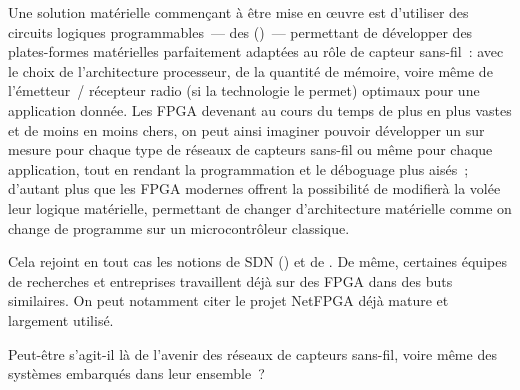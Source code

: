 \medskip

Une solution matérielle commençant à être mise en {\oe}uvre est
d'utiliser des circuits logiques programmables~--- des 
()~--- permettant de développer
des plates-formes matérielles parfaitement adaptées au rôle de capteur
sans-fil~: avec le choix de l'architecture processeur, de la quantité
de mémoire, voire même de l'émetteur~/ récepteur radio (si la technologie
le permet) optimaux pour une application donnée. Les FPGA devenant au
cours du temps de plus en plus vastes et de moins en moins chers, on peut
ainsi imaginer pouvoir développer un  sur mesure
pour chaque type de réseaux de capteurs sans-fil ou même pour chaque
application, tout en rendant la programmation et le déboguage plus aisés~;
d'autant plus que les FPGA modernes offrent la possibilité de
modifier\footnotemark[2] à la volée leur logique matérielle, permettant
de changer d'architecture matérielle comme on change de programme sur un
microcontrôleur classique.


Cela rejoint en tout cas les notions de SDN () et de . De même, certaines
équipes de recherches et entreprises travaillent déjà sur des FPGA
dans des buts similaires. On peut notamment citer le projet NetFPGA
\cite{NetFPGA} déjà mature et largement utilisé\footnotemark[3].

Peut-être s'agit-il là de l'avenir des réseaux de capteurs sans-fil,
voire même des systèmes embarqués dans leur ensemble~?





